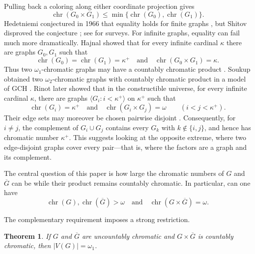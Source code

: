 \documentclass[10pt,a4paper]{amsart}
\numberwithin{equation}{section}
\newtheorem{theorem}{Theorem}[section]
\theoremstyle{definition}
\theoremstyle{remark}
\newcommand{\chr}{\operatorname{chr}}
\begin{document}
Pulling back a coloring along either coordinate projection gives
\begin{displaymath}
 \chr(G_0\times G_1)\leq
 \min\{\chr(G_0),\chr(G_1)\}.
\end{displaymath}
Hedetniemi conjectured in 1966 that equality holds for finite graphs
\cite{Hedetniemi1966}, but Shitov disproved the conjecture
\cite{Shitov2019}; see \cite{Sauer2001,Zhu2025} for surveys.  For
infinite graphs, equality can fail much more dramatically.  Hajnal
showed that for every infinite cardinal $\kappa$ there are graphs
$G_0,G_1$ such that
\begin{displaymath}
 \chr(G_0)=\chr(G_1)=\kappa^+
 \quad\text{and}\quad
 \chr(G_0\times G_1)=\kappa.
\end{displaymath}
Thus two $\omega_1$-chromatic graphs may have a countably chromatic
product \cite{Hajnal1985}.  Soukup obtained two $\omega_2$-chromatic
graphs with countably chromatic product in a model of GCH
\cite{Soukup1988}.  Rinot later showed that in the constructible
universe, for every infinite cardinal $\kappa$, there are graphs
$\langle G_i:i<\kappa^+\rangle$ on $\kappa^+$ such that
\begin{displaymath}
 \chr(G_i)=\kappa^+
 \quad\text{and}\quad
 \chr(G_i\times G_j)=\omega
 \qquad(i<j<\kappa^+).
\end{displaymath}
Their edge sets may moreover be chosen pairwise disjoint
\cite{Rinot2017}.  Consequently, for $i\ne j$, the complement of
$G_i\cup G_j$ contains every $G_k$ with $k\notin\{i,j\}$, and hence has
chromatic number $\kappa^+$.  This suggests looking at the opposite
extreme, where two edge-disjoint graphs cover every pair---that is,
where the factors are a graph and its complement.

The central question of this paper is how large the chromatic numbers
of $G$ and $\overline G$ can be while their product remains countably
chromatic.  In particular, can one have
\begin{equation}\label{eq:central}
 \chr(G),\chr(\overline G)>\omega
 \quad\text{and}\quad
 \chr(G\times\overline G)=\omega.                 \tag{$*$}
\end{equation}

The complementary requirement imposes a strong restriction.


\begin{theorem}\label{thm:size-bound}
If $G$ and $\overline G$ are uncountably chromatic and
$G\times\overline G$ is countably chromatic, then
$|V(G)|=\omega_1$.
\end{theorem}
\end{document}
